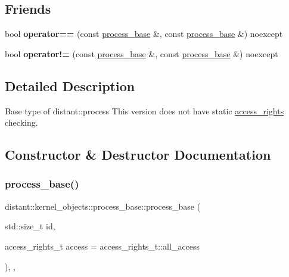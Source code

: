 \subsection*{Friends}
\begin{DoxyCompactItemize}
\item 
\mbox{\label{classdistant_1_1kernel__objects_1_1process__base_a023b8a425917f7dddc2144678a3d5bfb}} 
bool {\bfseries operator==} (const \mbox{\hyperlink{classdistant_1_1kernel__objects_1_1process__base}{process\+\_\+base}} \&, const \mbox{\hyperlink{classdistant_1_1kernel__objects_1_1process__base}{process\+\_\+base}} \&) noexcept
\item 
\mbox{\label{classdistant_1_1kernel__objects_1_1process__base_a5fd7d7dcf5b09480ae8c4b742562db1a}} 
bool {\bfseries operator!=} (const \mbox{\hyperlink{classdistant_1_1kernel__objects_1_1process__base}{process\+\_\+base}} \&, const \mbox{\hyperlink{classdistant_1_1kernel__objects_1_1process__base}{process\+\_\+base}} \&) noexcept
\end{DoxyCompactItemize}


\subsection{Detailed Description}
Base type of distant\+::process This version does not have static \mbox{\hyperlink{structdistant_1_1access__rights}{access\+\_\+rights}} checking. 

\subsection{Constructor \& Destructor Documentation}
\mbox{\label{classdistant_1_1kernel__objects_1_1process__base_a845358a2126f878a2777acf7d855b79b}} 
\subsubsection{\texorpdfstring{process\+\_\+base()}{process\_base()}}
{\footnotesize\ttfamily distant\+::kernel\+\_\+objects\+::process\+\_\+base\+::process\+\_\+base (\begin{DoxyParamCaption}\item[{std\+::size\+\_\+t}]{id,  }\item[{access\+\_\+rights\+\_\+t}]{access = {\ttfamily access\+\_\+rights\+\_\+t\+:\+:all\+\_\+access} }\end{DoxyParamCaption})\hspace{0.3cm}{\ttfamily [inline]}, {\ttfamily [explicit]}, {\ttfamily [noexcept]}}



